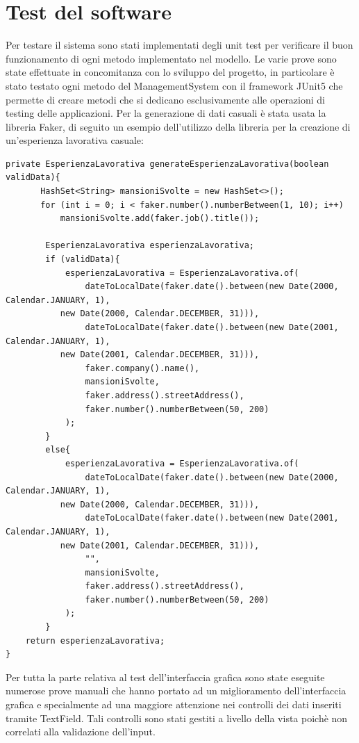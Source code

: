 \documentclass[ 4paper,11pt,openany]{book}
\begin{document}
\section{Test del software}
Per testare il sistema sono stati implementati degli unit test per verificare il buon funzionamento di ogni metodo implementato nel modello. Le varie prove sono state effettuate in concomitanza con lo sviluppo del progetto, in particolare è stato testato ogni metodo del ManagementSystem con il framework JUnit5 che permette di creare metodi che si dedicano esclusivamente alle operazioni di testing delle applicazioni.  Per la generazione di dati casuali è stata usata la libreria Faker, di seguito un esempio dell'utilizzo della libreria per la creazione di un'esperienza lavorativa casuale:
\begin{lstlisting}[basicstyle=\small,xleftmargin=-0.5cm]
private EsperienzaLavorativa generateEsperienzaLavorativa(boolean validData){
       HashSet<String> mansioniSvolte = new HashSet<>();
       for (int i = 0; i < faker.number().numberBetween(1, 10); i++)
           mansioniSvolte.add(faker.job().title());

        EsperienzaLavorativa esperienzaLavorativa;
        if (validData){
            esperienzaLavorativa = EsperienzaLavorativa.of(
                dateToLocalDate(faker.date().between(new Date(2000, Calendar.JANUARY, 1),
		   new Date(2000, Calendar.DECEMBER, 31))),
                dateToLocalDate(faker.date().between(new Date(2001, Calendar.JANUARY, 1),
		   new Date(2001, Calendar.DECEMBER, 31))),
                faker.company().name(),
                mansioniSvolte,
                faker.address().streetAddress(),
                faker.number().numberBetween(50, 200)
            );
        }
        else{
            esperienzaLavorativa = EsperienzaLavorativa.of(
                dateToLocalDate(faker.date().between(new Date(2000, Calendar.JANUARY, 1),
		   new Date(2000, Calendar.DECEMBER, 31))),
                dateToLocalDate(faker.date().between(new Date(2001, Calendar.JANUARY, 1),
		   new Date(2001, Calendar.DECEMBER, 31))),
                "",
                mansioniSvolte,
                faker.address().streetAddress(),
                faker.number().numberBetween(50, 200)
            );
        }
	return esperienzaLavorativa;
}
\end{lstlisting}
Per tutta la parte relativa al test dell'interfaccia grafica sono state eseguite numerose prove manuali che hanno portato ad un miglioramento dell'interfaccia grafica e specialmente ad una maggiore attenzione nei controlli dei dati inseriti tramite TextField. Tali controlli sono stati gestiti a livello della vista poichè non correlati alla validazione dell'input.
\end{document}
